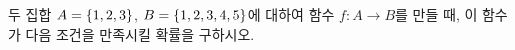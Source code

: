 두 집합 $A=\{1{,}\mkern3mu\mathopen{}2{,}\mkern3mu\mathopen{}3\}$, $B=\{1{,}\mkern3mu\mathopen{}2{,}\mkern3mu\mathopen{}3{,}\mkern3mu\mathopen{}4{,}\mkern3mu\mathopen{}5\}$에 대하여 함수 $f:A\longrightarrow B$를 만들 때, 이 함수가 다음 조건을 만족시킬 확률을 구하시오. 

